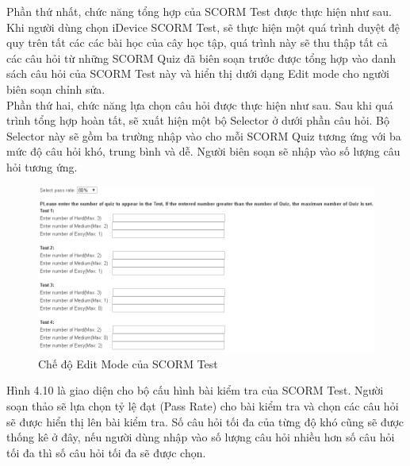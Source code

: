 	Phần thứ nhất, chức năng tổng hợp của SCORM Test được thực hiện như sau. Khi người dùng chọn iDevice SCORM Test, sẽ thực hiện một quá trình duyệt đệ quy trên tất các các bài học của cây học tập, quá trình này sẽ thu thập tất cả các câu hỏi từ những SCORM Quiz đã biên soạn trước được tổng hợp vào danh sách câu hỏi của SCORM Test này và hiển thị dưới dạng Edit mode cho người biên soạn chỉnh sửa. \\
	
	Phần thứ hai, chức năng lựa chọn câu hỏi được thực hiện như sau. Sau khi quá trình tổng hợp hoàn tất, sẽ xuất hiện một bộ Selector ở dưới phần câu hỏi. Bộ Selector này sẽ gồm ba trường nhập vào cho mỗi SCORM Quiz tương ứng với ba mức độ câu hỏi khó, trung bình và dễ. Người biên soạn sẽ nhập vào số lượng câu hỏi tương ứng.

\newpage

	\begin{center}
	\begin{figure}[htp]
		\begin{center}
			\includegraphics[width=16cm]{Chapter4/Pictures/picture410.png}
		\end{center}
		\caption{Chế độ Edit Mode của SCORM Test}
		\label{refpicture58}
	\end{figure}
\end{center}

Hình 4.10 là giao diện cho bộ cấu hình bài kiểm tra của SCORM Test. Người soạn thảo sẽ lựa chọn tỷ lệ đạt (Pass Rate) cho bài kiểm tra và chọn các câu hỏi sẽ được hiển thị lên bài kiểm tra. Số câu hỏi tối đa của từng độ khó cũng sẽ được thống kê ở đây, nếu người dùng nhập vào số lượng câu hỏi nhiều hơn số câu hỏi tối đa thì số câu hỏi tối đa sẽ được chọn.\\

